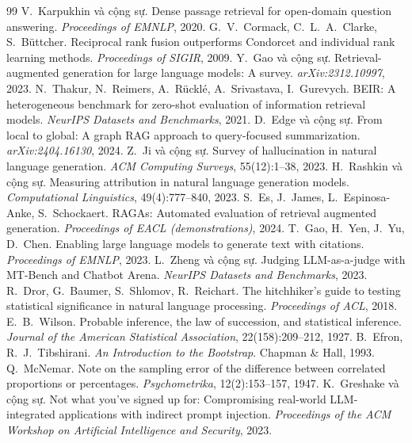 \begin{thebibliography}{99}
 V.~Karpukhin và cộng sự. Dense passage retrieval for open-domain question answering. \emph{Proceedings of EMNLP}, 2020.
 G.~V.~Cormack, C.~L.~A.~Clarke, S.~Büttcher. Reciprocal rank fusion outperforms Condorcet and individual rank learning methods. \emph{Proceedings of SIGIR}, 2009.
 Y.~Gao và cộng sự. Retrieval-augmented generation for large language models: A survey. \emph{arXiv:2312.10997}, 2023.
 N.~Thakur, N.~Reimers, A.~Rücklé, A.~Srivastava, I.~Gurevych. BEIR: A heterogeneous benchmark for zero-shot evaluation of information retrieval models. \emph{NeurIPS Datasets and Benchmarks}, 2021.
 D.~Edge và cộng sự. From local to global: A graph RAG approach to query-focused summarization. \emph{arXiv:2404.16130}, 2024.
 Z.~Ji và cộng sự. Survey of hallucination in natural language generation. \emph{ACM Computing Surveys}, 55(12):1--38, 2023.
 H.~Rashkin và cộng sự. Measuring attribution in natural language generation models. \emph{Computational Linguistics}, 49(4):777--840, 2023.
 S.~Es, J.~James, L.~Espinosa-Anke, S.~Schockaert. RAGAs: Automated evaluation of retrieval augmented generation. \emph{Proceedings of EACL (demonstrations)}, 2024.
 T.~Gao, H.~Yen, J.~Yu, D.~Chen. Enabling large language models to generate text with citations. \emph{Proceedings of EMNLP}, 2023.
 L.~Zheng và cộng sự. Judging LLM-as-a-judge with MT-Bench and Chatbot Arena. \emph{NeurIPS Datasets and Benchmarks}, 2023.
 R.~Dror, G.~Baumer, S.~Shlomov, R.~Reichart. The hitchhiker's guide to testing statistical significance in natural language processing. \emph{Proceedings of ACL}, 2018.
 E.~B.~Wilson. Probable inference, the law of succession, and statistical inference. \emph{Journal of the American Statistical Association}, 22(158):209--212, 1927.
 B.~Efron, R.~J.~Tibshirani. \emph{An Introduction to the Bootstrap}. Chapman \& Hall, 1993.
 Q.~McNemar. Note on the sampling error of the difference between correlated proportions or percentages. \emph{Psychometrika}, 12(2):153--157, 1947.
 K.~Greshake và cộng sự. Not what you've signed up for: Compromising real-world LLM-integrated applications with indirect prompt injection. \emph{Proceedings of the ACM Workshop on Artificial Intelligence and Security}, 2023.
\end{thebibliography}
